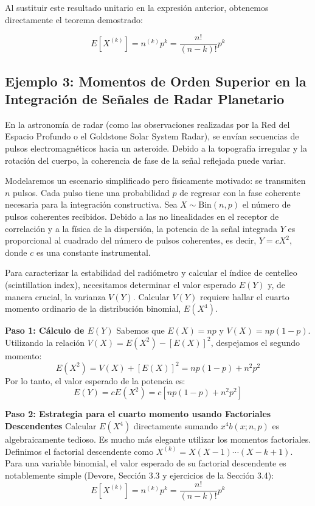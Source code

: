 Al sustituir este resultado unitario en la expresión anterior, obtenemos directamente el teorema demostrado:

$$ E[X^{(k)}] = n^{(k)} p^k = \frac{n!}{(n-k)!} p^k $$



\subsection{Ejemplo 3: Momentos de Orden Superior en la Integración de Señales de Radar Planetario}

En la astronomía de radar (como las observaciones realizadas por la Red del Espacio Profundo o el Goldstone Solar System Radar), se envían secuencias de pulsos electromagnéticos hacia un asteroide. Debido a la topografía irregular y la rotación del cuerpo, la coherencia de fase de la señal reflejada puede variar. 

Modelaremos un escenario simplificado pero físicamente motivado: se transmiten $n$ pulsos. Cada pulso tiene una probabilidad $p$ de regresar con la fase coherente necesaria para la integración constructiva. Sea $X \sim \text{Bin}(n, p)$ el número de pulsos coherentes recibidos. Debido a las no linealidades en el receptor de correlación y a la física de la dispersión, la potencia de la señal integrada $Y$ es proporcional al cuadrado del número de pulsos coherentes, es decir, $Y = cX^2$, donde $c$ es una constante instrumental.

Para caracterizar la estabilidad del radiómetro y calcular el índice de centelleo (scintillation index), necesitamos determinar el valor esperado $E(Y)$ y, de manera crucial, la varianza $V(Y)$. Calcular $V(Y)$ requiere hallar el cuarto momento ordinario de la distribución binomial, $E(X^4)$.

\textbf{Paso 1: Cálculo de $E(Y)$}
Sabemos que $E(X) = np$ y $V(X) = np(1-p)$. Utilizando la relación $V(X) = E(X^2) - [E(X)]^2$, despejamos el segundo momento:
$$ E(X^2) = V(X) + [E(X)]^2 = np(1-p) + n^2p^2 $$
Por lo tanto, el valor esperado de la potencia es:
$$ E(Y) = cE(X^2) = c[np(1-p) + n^2p^2] $$

\textbf{Paso 2: Estrategia para el cuarto momento usando Factoriales Descendentes}
Calcular $E(X^4)$ directamente sumando $x^4 b(x; n, p)$ es algebraicamente tedioso. Es mucho más elegante utilizar los momentos factoriales. Definimos el factorial descendente como $X^{(k)} = X(X-1)\cdots(X-k+1)$. 
Para una variable binomial, el valor esperado de su factorial descendente es notablemente simple (Devore, Sección 3.3 y ejercicios de la Sección 3.4):
$$ E[X^{(k)}] = n^{(k)} p^k = \frac{n!}{(n-k)!} p^k $$

